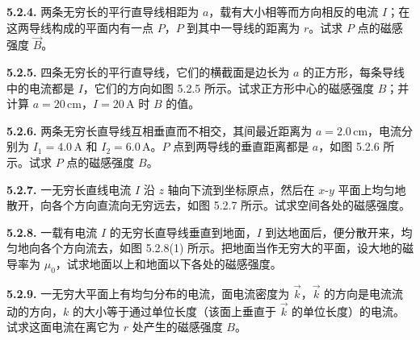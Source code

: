 \vfill
\newpage

\textbf{5.2.4.} 两条无穷长的平行直导线相距为 $a$，载有大小相等而方向相反的电流 $I$；在这两导线构成的平面内有一点 $P$，$P$ 到其中一导线的距离为 $r$。试求 $P$ 点的磁感强度 $\vec{B}$。

\vfill
\newpage

\textbf{5.2.5.} 四条无穷长的平行直导线，它们的横截面是边长为 $a$ 的正方形，每条导线中的电流都是 $I$，它们的方向如图 5.2.5 所示。试求正方形中心的磁感强度 $B$；并计算 $a = 20\,\mathrm{cm}$，$I = 20\,\mathrm{A}$ 时 $B$ 的值。

\begin{center}
\end{center}

\vfill
\newpage

\textbf{5.2.6.} 两条无穷长直导线互相垂直而不相交，其间最近距离为 $a = 2.0\,\mathrm{cm}$，电流分别为 $I_{1} = 4.0\,\mathrm{A}$ 和 $I_{2} = 6.0\,\mathrm{A}$。$P$ 点到两导线的垂直距离都是 $a$，如图 5.2.6 所示。试求 $P$ 点的磁感强度 $B$。

\begin{center}
\end{center}

\vfill
\newpage

\textbf{5.2.7.} 一无穷长直线电流 $I$ 沿 $z$ 轴向下流到坐标原点，然后在 $x\text{-}y$ 平面上均匀地散开，向各个方向直流向无穷远去，如图 5.2.7 所示。试求空间各处的磁感强度。

\begin{center}
\end{center}

\vfill
\newpage

\textbf{5.2.8.} 一载有电流 $I$ 的无穷长直导线垂直到地面，$I$ 到达地面后，便分散开来，均匀地向各个方向流去，如图 5.2.8(1) 所示。把地面当作无穷大的平面，设大地的磁导率为 $\mu_{0}$，试求地面以上和地面以下各处的磁感强度。

\begin{center}
\end{center}

\vfill
\newpage

\textbf{5.2.9.} 一无穷大平面上有均匀分布的电流，面电流密度为 $\vec{k}$，$\vec{k}$ 的方向是电流流动的方向，$k$ 的大小等于通过单位长度（该面上垂直于 $\vec{k}$ 的单位长度）的电流。试求这面电流在离它为 $r$ 处产生的磁感强度 $B$。

